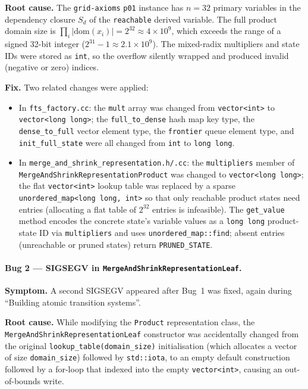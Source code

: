 \documentclass[11pt,a4paper]{article}
\begin{document}
\begin{itemize}
    \textbf{Root cause.}  The \texttt{grid-axioms} \texttt{p01} instance has
    $n = 32$ primary variables in the dependency closure $S_d$ of the
    \texttt{reachable} derived variable.  The full product domain size is
    $\prod_{i} |\mathrm{dom}(x_i)| = 2^{32} \approx 4 \times 10^9$, which
    exceeds the range of a signed 32-bit integer ($2^{31} - 1 \approx 2.1
    \times 10^9$).  The mixed-radix multipliers and state IDs were stored as
    \texttt{int}, so the overflow silently wrapped and produced invalid
    (negative or zero) indices.

    \textbf{Fix.}  Two related changes were applied:
    \begin{itemize}
      \item In \texttt{fts\_factory.cc}: the \texttt{mult} array was changed
        from \texttt{vector<int>} to \texttt{vector<long long>}; the
        \texttt{full\_to\_dense} hash map key type, the \texttt{dense\_to\_full}
        vector element type, the \texttt{frontier} queue element type, and
        \texttt{init\_full\_state} were all changed from \texttt{int} to
        \texttt{long long}.
      \item In \texttt{merge\_and\_shrink\_representation.h/.cc}: the
        \texttt{multipliers} member of
        \texttt{MergeAndShrinkRepresentationProduct} was changed to
        \texttt{vector<long long>}; the flat \texttt{vector<int>} lookup table
        was replaced by a sparse \texttt{unordered\_map<long long, int>} so
        that only reachable product states need entries (allocating a flat
        table of $2^{32}$ entries is infeasible).  The \texttt{get\_value}
        method encodes the concrete state's variable values as a \texttt{long
        long} product-state ID via \texttt{multipliers} and uses
        \texttt{unordered\_map::find}; absent entries (unreachable or pruned
        states) return \texttt{PRUNED\_STATE}.
    \end{itemize}

    \paragraph{Bug 2 --- SIGSEGV in \texttt{MergeAndShrinkRepresentationLeaf}.}
    \textbf{Symptom.}  A second SIGSEGV appeared after Bug~1 was fixed,
    again during ``Building atomic transition systems''.

    \textbf{Root cause.}  While modifying the \texttt{Product} representation
    class, the \texttt{MergeAndShrinkRepresentationLeaf} constructor was
    accidentally changed from the original \texttt{lookup\_table(domain\_size)}
    initialisation (which allocates a vector of size \texttt{domain\_size})
    followed by \texttt{std::iota}, to an empty default construction followed
    by a for-loop that indexed into the empty \texttt{vector<int>}, causing an
    out-of-bounds write.


\end{itemize}
\end{document}
